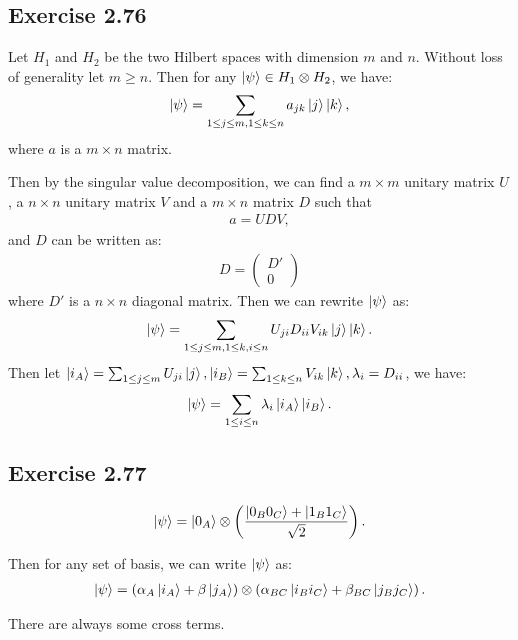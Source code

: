 \subsection*{Exercise 2.76}

Let $H_1$ and $H_2$ be the two Hilbert spaces with dimension $m$ and $n$. Without loss of generality let $m\geq n$. Then for any $\ket{\psi}\in H_1\otimes H_2$, we have:
\begin{align}
    \ket{\psi}=\sum_{1\leq j\leq m,1\leq k\leq n}a_{jk}\ket{j}\ket{k},
\end{align}
where $a$ is a $m\times n$ matrix.

Then by the singular value decomposition, we can find a $m\times m$ unitary matrix $U$, a $n\times n$ unitary matrix $V$ and a $m\times n$ matrix $D$ such that
\begin{align}
a=UDV,
\end{align}
and $D$ can be written as:
\begin{align}
D=\begin{pmatrix}
D'\\0
\end{pmatrix}
\end{align}
where $D'$ is a $n\times n$ diagonal matrix. Then we can rewrite $\ket{\psi}$ as:
\begin{align}
    \ket{\psi}=\sum_{1\leq j\leq m,1\leq k,i\leq n}U_{ji}D_{ii}V_{ik}\ket{j}\ket{k}.
\end{align}
Then let $\ket{i_A}=\sum_{1\leq j \leq m}U_{ji}\ket{j},\ket{i_B}=\sum_{1\leq k \leq n}V_{ik}\ket{k},\lambda_i=D_{ii}$, we have:
\begin{align}
    \ket{\psi}=\sum_{1\leq i\leq n}\lambda_i \ket{i_A}\ket{i_B}.
\end{align}
\subsection*{Exercise 2.77}
\begin{align}
    \ket{\psi}=\ket{0_A}\otimes \left(\frac{\ket{0_B0_C}+\ket{1_B1_C}}{\sqrt{2}}\right).
\end{align}

Then for any set of basis, we can write $\ket{\psi}$ as:
\begin{align}
    \ket{\psi}=(\alpha_A\ket{i_A}+\beta\ket{j_A})\otimes \left(\alpha_{BC}\ket{i_Bi_C}+\beta_{BC}\ket{j_Bj_C}\right).
\end{align}

There are always some cross terms.

